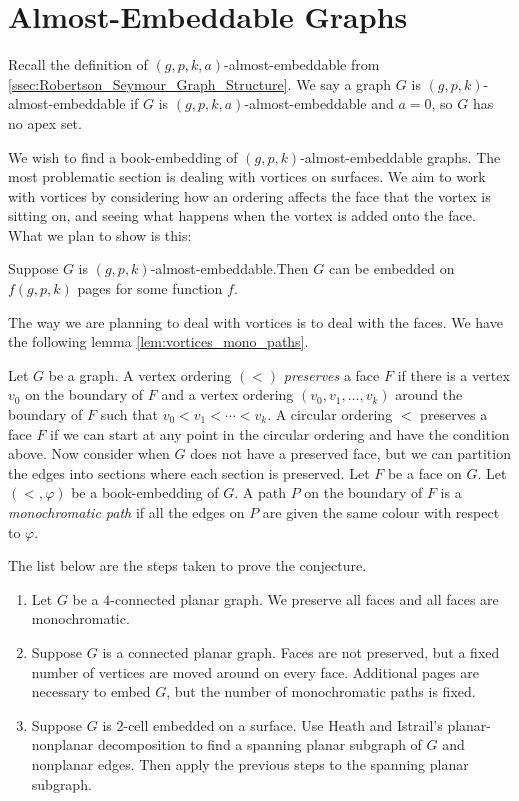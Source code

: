 \section{Almost-Embeddable Graphs}
Recall the definition of $(g, p, k, a)$-almost-embeddable from \cref{ssec:Robertson_Seymour_Graph_Structure}. We say a graph $G$ is $(g, p, k)$-almost-embeddable if $G$ is $(g, p, k, a)$-almost-embeddable and $a = 0$, so $G$ has no apex set.

We wish to find a book-embedding of $(g, p, k)$-almost-embeddable graphs.
The most problematic section is dealing with vortices on surfaces.
We aim to work with vortices by considering how an ordering affects the face that the vortex is sitting on, and seeing what happens when the vortex is added onto the face.
What we plan to show is this:
\begin{conjecture}
	Suppose $G$ is $(g, p, k)$-almost-embeddable.Then $G$ can be embedded on \(f(g, p, k)\) pages for some function $f$.
\end{conjecture}
The way we are planning to deal with vortices is to deal with the faces. We have the following lemma \cref{lem:vortices_mono_paths}. 

Let \(G\) be a graph. A vertex ordering \((<)\) \textit{preserves} a face \(F\) if there is a vertex \(v_0\) on the boundary of \(F\) and a vertex ordering \((v_0, v_1, \ldots, v_k)\) around the boundary of \(F\) such that \(v_0 < v_1 < \cdots < v_k\).
A circular ordering \(<\) preserves a face \(F\) if we can start at any point in the circular ordering and have the condition above.
Now consider when \(G\) does not have a preserved face, but we can partition the edges into sections where each section is preserved. Let \(F\) be a face on \(G\). Let \( (<, \varphi) \) be a book-embedding of \(G\). A path \(P\) on the boundary of \(F\) is a \textit{monochromatic path} if all the edges on \(P\) are given the same colour with respect to \( \varphi \). 

The list below are the steps taken to prove the conjecture.
\begin{enumerate}
	\item Let $G$ be a \(4\)-connected planar graph. We preserve all faces and all faces are monochromatic.
	\item Suppose \(G\) is a connected planar graph. Faces are not preserved, but a fixed number of vertices are moved around on every face. Additional pages are necessary to embed $G$, but the number of monochromatic paths is fixed. 
	\item Suppose \(G\) is $2$-cell embedded on a surface. Use Heath and Istrail's \cite{heathPagenumberGenusGraphs1992} planar-nonplanar decomposition to find a spanning planar subgraph of $G$ and nonplanar edges. Then apply the previous steps to the spanning planar subgraph.
\end{enumerate}

